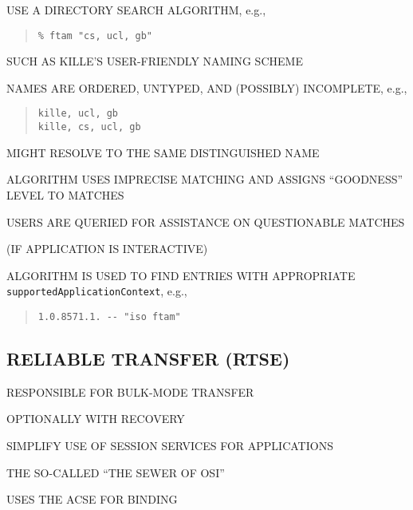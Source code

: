 \begin{bwslide}

\begin{nrtc}
\item	USE A DIRECTORY SEARCH ALGORITHM, e.g.,
\begin{quote}\small\begin{verbatim}
% ftam "cs, ucl, gb"
\end{verbatim}\end{quote}
	SUCH AS KILLE'S USER-FRIENDLY NAMING SCHEME

\item	NAMES ARE ORDERED, UNTYPED, AND (POSSIBLY) INCOMPLETE, e.g.,
\begin{quote}\small\begin{verbatim}
kille, ucl, gb
kille, cs, ucl, gb
\end{verbatim}\end{quote}
	MIGHT RESOLVE TO THE SAME DISTINGUISHED NAME

\item	ALGORITHM USES IMPRECISE MATCHING AND ASSIGNS ``GOODNESS'' LEVEL TO
	MATCHES

\item	USERS ARE QUERIED FOR ASSISTANCE ON QUESTIONABLE MATCHES
    \begin{nrtc}
    \item	(IF APPLICATION IS INTERACTIVE)
    \end{nrtc}

\item	ALGORITHM IS USED TO FIND ENTRIES WITH APPROPRIATE
	\verb"supportedApplicationContext", e.g.,
\begin{quote}\small\begin{verbatim}
1.0.8571.1. -- "iso ftam"
\end{verbatim}\end{quote}
\end{nrtc}
\end{bwslide}


\begin{bwslide}
\part*	{RELIABLE TRANSFER (RTSE)}\bf

\begin{nrtc}
\item	RESPONSIBLE FOR BULK-MODE TRANSFER
    \begin{nrtc}
    \item	OPTIONALLY WITH RECOVERY
    \end{nrtc}

\item	SIMPLIFY USE OF SESSION SERVICES FOR APPLICATIONS
    \begin{nrtc}
    \item	THE SO-CALLED ``THE SEWER OF OSI''
    \end{nrtc}

\item	USES THE ACSE FOR BINDING
\end{nrtc}
\end{bwslide}


